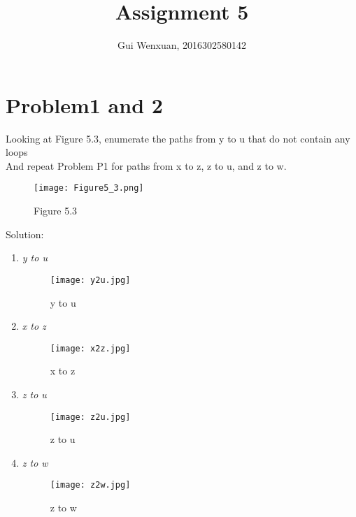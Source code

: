 \documentclass{article}
\author{Gui Wenxuan, 2016302580142}
\title{Assignment 5}
\begin{document}
   \maketitle
  
\newpage
\section{Problem1 and 2} Looking at Figure 5.3, enumerate the paths from y to u that do not contain any loops\\
And repeat Problem P1 for paths from x to z, z to u, and z to w.\\

\begin{figure}[htbp]
\begin{center}
\texttt{[image: Figure5\_3.png]}
\caption{Figure 5.3}
\label{Figure 5.3}
\end{center}
\end{figure}



\noindent Solution:\\
\begin{enumerate}
\item \emph{y to u} \\
\begin{figure}[htbp]
\begin{center}
\texttt{[image: y2u.jpg]}
\caption{y to u}
\label{default}
\end{center}
\end{figure}
\item \emph{x to z} \\
\begin{figure}[htbp]
\begin{center}
\texttt{[image: x2z.jpg]}
\caption{x to z}
\label{default}
\end{center}
\end{figure}
\item \emph{z to u} \\
\begin{figure}[htbp]
\begin{center}
\texttt{[image: z2u.jpg]}
\caption{z to u}
\label{default}
\end{center}
\end{figure}
\item \emph{z to w} \\
\begin{figure}[htbp]
\begin{center}
\texttt{[image: z2w.jpg]}
\caption{z to w}
\label{default}
\end{center}
\end{figure}
\end{enumerate}
\end{document}
